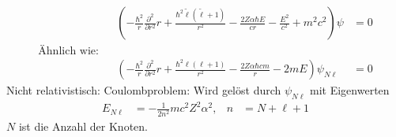 	\begin{align*}
		& &\left(
			-\frac{\hbar^2}{r} \frac{\partial^2}{\partial r^2} r 
			+ \frac{\hbar^2 \tilde{\ell} (\tilde{\ell} + 1)}{r^2} 
			- \frac{2 Z \alpha \hbar E}{cr} 
			- \frac{E^2}{c^2} + m^2c^2
		\right) \psi &= 0 \\
		\text{Ähnlich wie:}& \\
		& &\left(
			-\frac{\hbar^2}{r} \frac{\partial^2}{\partial r^2} r 
			+ \frac{\hbar^2 \ell (\ell + 1)}{r^2} 
			- \frac{2 Z \alpha \hbar cm}{r} 
			- 2mE
		\right) \psi_{N\ell}&= 0
	\end{align*}
Nicht relativistisch: Coulombproblem: Wird gelöst durch $\psi_{N\ell}$ mit Eigenwerten
	\begin{align*}
		E_{N\ell} &= -\frac{1}{2n^2} mc^2 Z^2 \alpha^2 ,&
		n &= N + \ell + 1
	\end{align*}
$N$ ist die Anzahl der Knoten.

